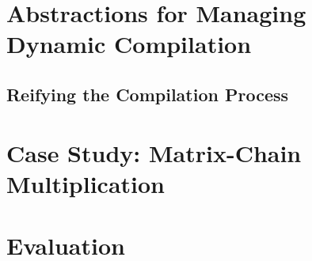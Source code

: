 \section{Abstractions for Managing Dynamic Compilation}

\subsection{Reifying the Compilation Process}

\section{Case Study: Matrix-Chain Multiplication}
\label{sec:matrix-chain-multiplication}

\section{Evaluation}
\label{sec:p2-evaluation}

\section{}
